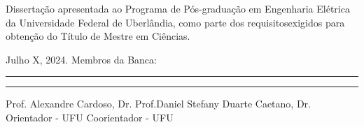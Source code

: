 
\newpage
\thispagestyle{empty}   %
\begin{center}
\ABNTEXchapterfont\large\imprimirautor
\vskip 4cm
\ABNTEXchapterfont\bfseries\Large\imprimirtitulo
\end{center}
\vskip 2cm


\hfill                                                         %
\begin{minipage}{11cm}
Dissertação apresentada ao Programa de Pós-graduação em Engenharia Elétrica da Universidade Federal de Uberlândia, como parte dos requisitosexigidos para obtenção do Título de Mestre em Ciências.

\end{minipage}
\vskip 0.5cm
\noindent  Julho X,  2024.
\vskip 0.5cm
\noindent Membros da Banca:
\vskip 1cm
\begin{flushleft}
\rule{7cm}{0.4mm}
\hskip 36pt
\rule{7.3cm}{0.4mm}
\end{flushleft}
\vspace{-0.5cm}
Prof. Alexandre Cardoso, Dr. \hskip 1.65cm Prof.Daniel Stefany Duarte Caetano, Dr.\\
Orientador - UFU \hskip 5.6cm Coorientador - UFU \\
